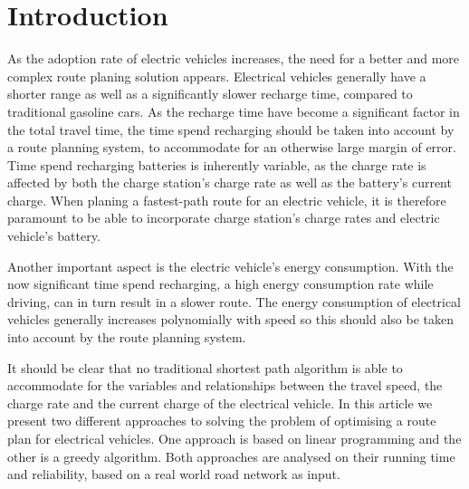\section{Introduction}

As the adoption rate of electric vehicles increases, the need for a better and more complex route planing solution appears. Electrical vehicles generally have a shorter range as well as a significantly slower recharge time, compared to traditional gasoline cars. As the recharge time have become a significant factor in the total travel time, the time spend recharging should be taken into account by a route planning system, to accommodate for an otherwise large margin of error. Time spend recharging batteries is inherently variable, as the charge rate is affected by both the charge station's charge rate as well as the battery's current charge. When planing a fastest-path route for an electric vehicle, it is therefore paramount to be able to incorporate charge station's charge rates and electric vehicle's battery.

Another important aspect is the electric vehicle's energy consumption. With the now significant time spend recharging, a high energy consumption rate while driving, can in turn result in a slower route. The energy consumption of electrical vehicles generally increases polynomially with speed so this should also be taken into account by the route planning system.

It should be clear that no traditional shortest path algorithm is able to accommodate for the variables and relationships between the travel speed, the charge rate and the current charge of the electrical vehicle. In this article we present two different approaches to solving the problem of optimising a route plan for electrical vehicles. One approach is based on linear programming and the other is a greedy algorithm. Both approaches are analysed on their running time and reliability, based on a real world road network as input.




